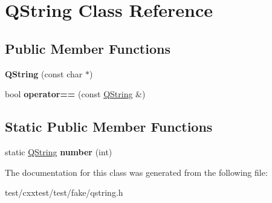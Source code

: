 \hypertarget{classQString}{\section{Q\-String Class Reference}
\label{classQString}
}
\subsection*{Public Member Functions}
\begin{DoxyCompactItemize}
\item 
\hypertarget{classQString_a7eab0e993319175627a959fa108a9414}{{\bfseries Q\-String} (const char $\ast$)}\label{classQString_a7eab0e993319175627a959fa108a9414}

\item 
\hypertarget{classQString_abf00da2f8ffa66284a116e2a90193458}{bool {\bfseries operator==} (const \hyperlink{classQString}{Q\-String} \&)}\label{classQString_abf00da2f8ffa66284a116e2a90193458}

\end{DoxyCompactItemize}
\subsection*{Static Public Member Functions}
\begin{DoxyCompactItemize}
\item 
\hypertarget{classQString_a83c981355a459ac06ebe838572722d99}{static \hyperlink{classQString}{Q\-String} {\bfseries number} (int)}\label{classQString_a83c981355a459ac06ebe838572722d99}

\end{DoxyCompactItemize}


The documentation for this class was generated from the following file\-:\begin{DoxyCompactItemize}
\item 
test/cxxtest/test/fake/qstring.\-h\end{DoxyCompactItemize}
